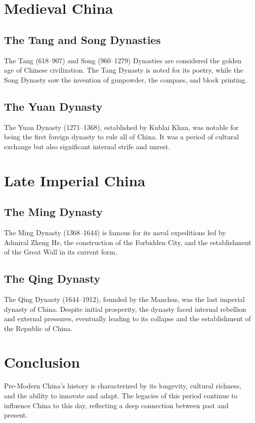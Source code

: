 \documentclass[a4paper,12pt]{book}
\begin{document}
\section{Medieval China}
\subsection{The Tang and Song Dynasties}
The Tang (618–907) and Song (960–1279) Dynasties are considered the golden age of Chinese civilization. The Tang Dynasty is noted for its poetry, while the Song Dynasty saw the invention of gunpowder, the compass, and block printing.

\subsection{The Yuan Dynasty}
The Yuan Dynasty (1271–1368), established by Kublai Khan, was notable for being the first foreign dynasty to rule all of China. It was a period of cultural exchange but also significant internal strife and unrest.

\section{Late Imperial China}
\subsection{The Ming Dynasty}
The Ming Dynasty (1368–1644) is famous for its naval expeditions led by Admiral Zheng He, the construction of the Forbidden City, and the establishment of the Great Wall in its current form.

\subsection{The Qing Dynasty}
The Qing Dynasty (1644–1912), founded by the Manchus, was the last imperial dynasty of China. Despite initial prosperity, the dynasty faced internal rebellion and external pressures, eventually leading to its collapse and the establishment of the Republic of China.

\section{Conclusion}
Pre-Modern China's history is characterized by its longevity, cultural richness, and the ability to innovate and adapt. The legacies of this period continue to influence China to this day, reflecting a deep connection between past and present.
\end{document}
